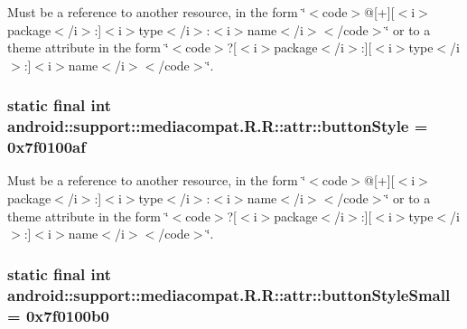 Must be a reference to another resource, in the form \char`\"{}$<$code$>$@\mbox{[}+\mbox{]}\mbox{[}$<$i$>$package$<$/i$>$:\mbox{]}$<$i$>$type$<$/i$>$:$<$i$>$name$<$/i$>$$<$/code$>$\char`\"{} or to a theme attribute in the form \char`\"{}$<$code$>$?\mbox{[}$<$i$>$package$<$/i$>$:\mbox{]}\mbox{[}$<$i$>$type$<$/i$>$:\mbox{]}$<$i$>$name$<$/i$>$$<$/code$>$\char`\"{}. \hypertarget{classandroid_1_1support_1_1mediacompat_1_1_r_1_1attr_befe707a8a5e25a04e9ca4cff0c6e6a7}{
\subsubsection[{buttonStyle}]{\setlength{\rightskip}{0pt plus 5cm}static final int android::support::mediacompat.R.R::attr::buttonStyle = 0x7f0100af}}
\label{classandroid_1_1support_1_1mediacompat_1_1_r_1_1attr_befe707a8a5e25a04e9ca4cff0c6e6a7}


Must be a reference to another resource, in the form \char`\"{}$<$code$>$@\mbox{[}+\mbox{]}\mbox{[}$<$i$>$package$<$/i$>$:\mbox{]}$<$i$>$type$<$/i$>$:$<$i$>$name$<$/i$>$$<$/code$>$\char`\"{} or to a theme attribute in the form \char`\"{}$<$code$>$?\mbox{[}$<$i$>$package$<$/i$>$:\mbox{]}\mbox{[}$<$i$>$type$<$/i$>$:\mbox{]}$<$i$>$name$<$/i$>$$<$/code$>$\char`\"{}. \hypertarget{classandroid_1_1support_1_1mediacompat_1_1_r_1_1attr_8ca68ae1ed4546fd85782eea3d6e8014}{
\subsubsection[{buttonStyleSmall}]{\setlength{\rightskip}{0pt plus 5cm}static final int android::support::mediacompat.R.R::attr::buttonStyleSmall = 0x7f0100b0}}
\label{classandroid_1_1support_1_1mediacompat_1_1_r_1_1attr_8ca68ae1ed4546fd85782eea3d6e8014}


